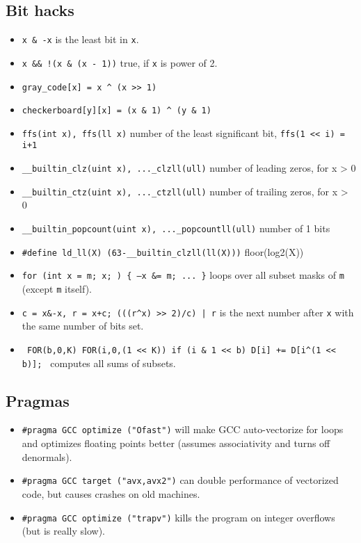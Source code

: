 	\subsection{Bit hacks}
		\begin{itemize}
			\item \texttt{x \& -x} is the least bit in \texttt{x}.
            \item \texttt{x \&\& !(x \& (x - 1))} true, if \texttt{x} is power of 2.
            \item \texttt{gray\_code[x] = x \^{} (x >> 1)}
            \item \texttt{checkerboard[y][x] = (x \& 1) \^{} (y \& 1)}
            \item \texttt{ffs(int x), ffs(ll x)} number of the least significant bit, \texttt{ffs(1 << i) = i+1}
            \item \texttt{\_\_builtin\_clz(uint x), ...\_clzll(ull)} number of leading zeros, for x > 0
            \item \texttt{\_\_builtin\_ctz(uint x), ...\_ctzll(ull)} number of trailing zeros, for x > 0
            \item \texttt{\_\_builtin\_popcount(uint x), ...\_popcountll(ull)} number of 1 bits
            \item \texttt{\#define ld\_ll(X) (63-\_\_builtin\_clzll(ll(X)))} floor(log2(X))
			\item \texttt{for (int x = m; x; ) \{ --x \&= m; ... \}} loops over all subset masks of \texttt{m} (except \texttt{m} itself).
			\item \texttt{c = x\&-x, r = x+c; (((r\^{}x) >> 2)/c) | r} is the next number after \texttt{x} with the same number of bits set.
			\item \texttt{ FOR(b,0,K) FOR(i,0,(1 << K)) if (i \& 1 << b) D[i] += D[i\^{}(1 << b)]; } computes all sums of subsets.
		\end{itemize}
        \subsection{Pragmas}
		\begin{itemize}
        \item \lstinline{#pragma GCC optimize ("Ofast")} will make GCC auto-vectorize for loops and optimizes floating points better (assumes associativity and turns off denormals).
        \item \lstinline{#pragma GCC target ("avx,avx2")} can double performance of vectorized code, but causes crashes on old machines.
        \item \lstinline{#pragma GCC optimize ("trapv")} kills the program on integer overflows (but is really slow).
		\end{itemize}

